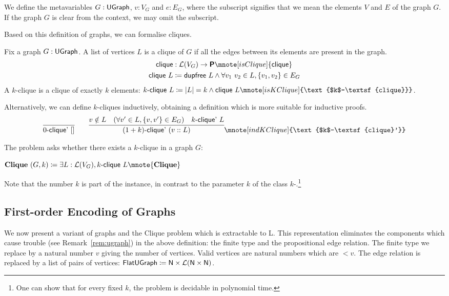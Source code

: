We define the metavariables $G : \textsf{UGraph}$, $v : V_G$ and $e : E_G$, where the subscript signifies that we mean the elements $V$ and $E$ of the graph $G$. If the graph $G$ is clear from the context, we may omit the subscript. 

\newcommand{\clique}{\textsf{clique}}
\newcommand{\kclique}[1]{\text{$#1$-\clique}} 
\newcommand{\kcliqueind}[1]{\text{$#1$-\textsf{clique}'}}
Based on this definition of graphs, we can formalise cliques. 
\begin{definition}
  Fix a graph $G : \textsf{UGraph}$. A list of vertices $L$ is a clique of $G$ if all the edges between its elements are present in the graph.
  \begin{align*}
    \clique{} &: \listsof{V_G} \rightarrow \Prop\mnote[isClique]{\clique{}} \\
    \clique{}~L &\defeq \dupfree~L \land \forall v_1~v_2 \in L, \{v_1, v_2\} \in E_G 
  \end{align*}
  A $k$-clique is a clique of exactly $k$ elements: 
  $\kclique{k}~L \defeq \length{L} = k \land \clique{}~L\mnote[isKClique]{\kclique{k}}$.
\end{definition}

Alternatively, we can define $k$-cliques inductively, obtaining a definition which is more suitable for inductive proofs. 
\begin{align*}
  \infer{\kcliqueind{0}~\nil}{} \qquad \infer{\kcliqueind{(\natS{k})}~(v :: L)}{v \notin L \quad (\forall v' \in L, \{v, v'\} \in E_G) \quad \kcliqueind{k}~L}\mnote[indKClique]{\kcliqueind{k}}
\end{align*}

The \Clique{} problem asks whether there exists a $k$-clique in a graph $G$: 
\begin{definition}[\Clique{}][Clique]
  $\Clique{}~(G, k) \defeq \exists L : \listsof{V_G}, \kclique{k}~L\mnote{\Clique{}}$
\end{definition}
Note that the number $k$ is part of the instance, in contrast to the parameter $k$ of the class $k$-\SAT{}.\footnote{One can show that for every fixed $k$, the \Clique{} problem is decidable in polynomial time.}

\newcommand{\FlatClique}{\textbf{FlatClique}}
\newcommand{\FlatUGraph}{\textsf{FlatUGraph}}
\subsection{First-order Encoding of Graphs}\label{sec:flat_clique}
We now present a variant of graphs and the Clique problem which is extractable to L. This representation eliminates the components which cause trouble (see Remark~\ref{rem:ugraph}) in the above definition: the finite type and the propositional edge relation. 
The finite type we replace by a natural number $v$ giving the number of vertices. Valid vertices are natural numbers which are $< v$. The edge relation is replaced by a list of pairs of vertices: $\FlatUGraph \defeq \nat \times \listsof{\nat \times \nat}$.\mnote[FlatUGraph]{\FlatUGraph}


